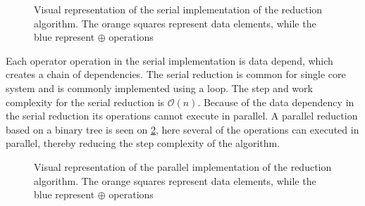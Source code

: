\begin{figure}[ht]
	\centering
	\caption{Visual representation of the serial implementation of the reduction algorithm. The orange squares represent data elements, while the blue represent $\oplus$ operations}
	\label{fig:reduce_serial}
\end{figure}

Each operator operation in the serial implementation is data depend, which creates a chain of dependencies. The serial reduction is common for single core system and is commonly implemented using a loop. The step and work complexity for the serial reduction is $\mathcal{O}(n)$. Because of the data dependency in the serial reduction its operations cannot execute in parallel. A parallel reduction based on a binary tree is seen on \cref{fig:reduce_parallel}, here several of the operations can executed in parallel, thereby reducing the step complexity of the algorithm. 

\begin{figure}[ht]
	\centering
	\caption{Visual representation of the parallel implementation of the reduction algorithm. The orange squares represent data elements, while the blue represent $\oplus$ operations}
	\label{fig:reduce_parallel}
\end{figure}

